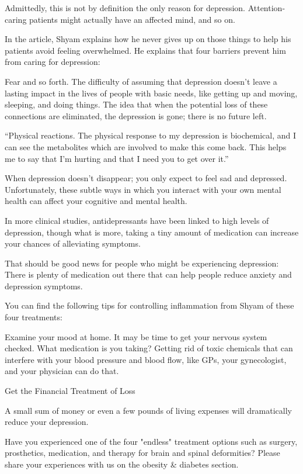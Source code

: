 \documentclass{article}
\begin{document}
Admittedly, this is not by definition the only reason for depression. Attention-caring patients might actually have an affected mind, and so on.

In the article, Shyam explains how he never gives up on those things to help his patients avoid feeling overwhelmed. He explains that four barriers prevent him from caring for depression:

Fear and so forth. The difficulty of assuming that depression doesn’t leave a lasting impact in the lives of people with basic needs, like getting up and moving, sleeping, and doing things. The idea that when the potential loss of these connections are eliminated, the depression is gone; there is no future left.

“Physical reactions. The physical response to my depression is biochemical, and I can see the metabolites which are involved to make this come back. This helps me to say that I’m hurting and that I need you to get over it.”

When depression doesn’t disappear; you only expect to feel sad and depressed. Unfortunately, these subtle ways in which you interact with your own mental health can affect your cognitive and mental health.

In more clinical studies, antidepressants have been linked to high levels of depression, though what is more, taking a tiny amount of medication can increase your chances of alleviating symptoms.

That should be good news for people who might be experiencing depression: There is plenty of medication out there that can help people reduce anxiety and depression symptoms.

You can find the following tips for controlling inflammation from Shyam of these four treatments:

Examine your mood at home. It may be time to get your nervous system checked. What medication is you taking? Getting rid of toxic chemicals that can interfere with your blood pressure and blood flow, like GPs, your gynecologist, and your physician can do that.

Get the Financial Treatment of Loss

A small sum of money or even a few pounds of living expenses will dramatically reduce your depression.

Have you experienced one of the four "endless" treatment options such as surgery, prosthetics, medication, and therapy for brain and spinal deformities? Please share your experiences with us on the obesity \& diabetes section.
\end{document}

